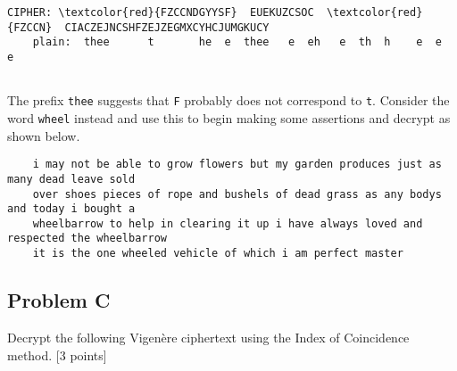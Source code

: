 \documentclass[../hw_sols.tex]{subfiles}
\begin{document}
\begin{solution}
\begin{BVerbatim}[commandchars=\\\{\}]
    CIPHER: \textcolor{red}{FZCCNDGYYSF}  EUEKUZCSOC  \textcolor{red}{FZCCN}  CIACZEJNCSHFZEJZEGMXCYHCJUMGKUCY
    plain:  thee      t       he  e  thee   e  eh   e  th  h    e  e      e
	
	\end{BVerbatim}

\noindent The prefix \verb|thee| suggests that \verb|F| probably does not correspond to \verb|t|. Consider the word {\color{red}\verb|wheel|} instead and use this to begin making some assertions and decrypt as shown below.

	\begin{verbatim}
    i may not be able to grow flowers but my garden produces just as many dead leave sold 
    over shoes pieces of rope and bushels of dead grass as any bodys and today i bought a 
    wheelbarrow to help in clearing it up i have always loved and respected the wheelbarrow 
    it is the one wheeled vehicle of which i am perfect master
	\end{verbatim}

\end{solution}


\newpage



\subsection*{Problem C}
Decrypt the following Vigenère ciphertext using the Index of Coincidence method. [3 points]

\end{document}
